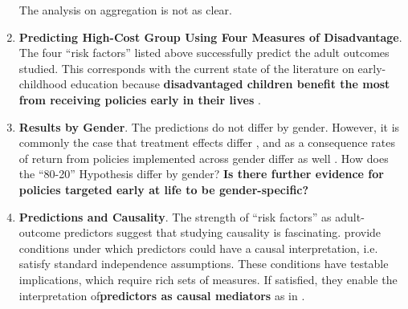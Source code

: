 \begin{enumerate}
\noindent The analysis on aggregation is not as clear.\\

\item \textbf{Predicting High-Cost Group Using Four Measures of Disadvantage}.\\
\noindent The four ``risk factors'' listed above successfully predict the adult outcomes studied. This corresponds with the current state of the literature on early-childhood education because \textbf{disadvantaged children benefit the most from receiving policies early in their lives} \citep{Elango_Hojman_etal_2016_Early-Edu}.\\

\item \textbf{Results by Gender}.
\noindent The predictions do not differ by gender. However, it is commonly the case that treatment effects differ \citep[see][]{Elango_Hojman_etal_2016_Early-Edu}, and as a consequence rates of return from policies implemented across gender differ as well \citep[see][]{Garcia_etal_2016_Comp_CBA_Unpublished}. How does the  ``80-20'' Hypothesis differ by gender? \textbf{Is there further evidence for policies targeted early at life to be gender-specific?}\\

\item \textbf{Predictions and Causality}.
\noindent The strength of ``risk factors'' as adult-outcome predictors suggest that studying causality is fascinating. \citet{Garcia_etal_2016_Comp_CBA_Unpublished} provide conditions under which predictors could have a causal interpretation, i.e. satisfy standard independence assumptions. These conditions have testable implications, which require rich sets of measures. If satisfied, they enable the interpretation of\textbf{predictors as causal mediators} as in \citep{Heckman_Pinto_etal_2013_PerryFactor}.

\end{enumerate}


\pagebreak
\singlespace



